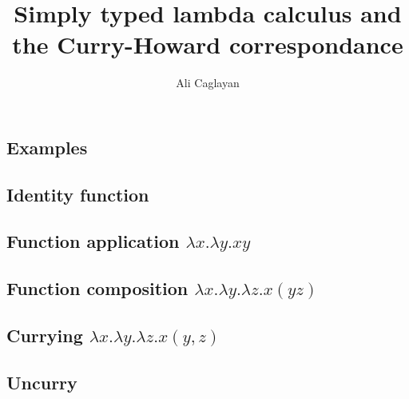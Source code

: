 \documentclass{article}
\title{Simply typed lambda calculus and the Curry-Howard correspondance}
\author{Ali Caglayan}
\theoremstyle{definition}
\begin{document}
\maketitle

\tableofcontents
















\newpage
\begin{appendices}
		
    \begin{landscape}
    	\section{Examples}
        \subsection{Identity function}  \label{ex1}
        \subsection{Function application \texorpdfstring{$\lambda x . \lambda y . x y$}{}}  \label{ex2}
        \newpage \subsection{Function composition \texorpdfstring{$\lambda x . \lambda y . \lambda z . x ( y z)$}{}}  \label{ex7}        
        \newpage \subsection{Currying \texorpdfstring{$\lambda x . \lambda y . \lambda z . x (y, z)$}{}}  \label{ex8}
        \newpage \subsection{Uncurry}  \label{ex9}
    \end{landscape}
\end{appendices}


 

\end{document}

